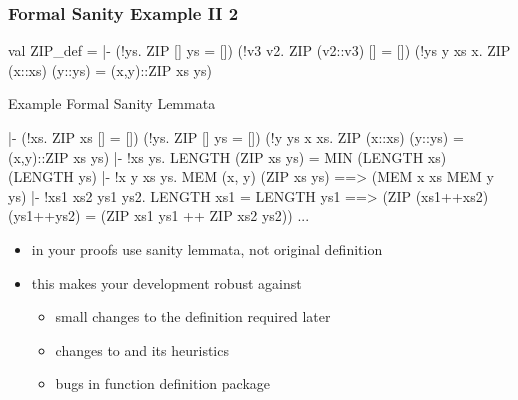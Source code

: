 \begin{frame}[fragile]
\frametitle{Formal Sanity Example II 2}

\begin{semiverbatim}\scriptsize
val ZIP_def =
 |- (!ys. ZIP [] ys = []) \holAnd{} (!v3 v2. ZIP (v2::v3) [] = []) \holAnd{}
    (!ys y xs x. ZIP (x::xs) (y::ys) = (x,y)::ZIP xs ys)
\end{semiverbatim}
\begin{block}{Example Formal Sanity Lemmata}
\begin{semiverbatim}\scriptsize
|- (!xs. ZIP xs [] = []) \holAnd{} (!ys. ZIP [] ys = []) \holAnd{}
   (!y ys x xs. ZIP (x::xs) (y::ys) = (x,y)::ZIP xs ys)\smallskip
|- !xs ys. LENGTH (ZIP xs ys) = MIN (LENGTH xs) (LENGTH ys)\smallskip
|- !x y xs ys. MEM (x, y) (ZIP xs ys) ==> (MEM x xs \holAnd{} MEM y ys)\smallskip
|- !xs1 xs2 ys1 ys2. LENGTH xs1 = LENGTH ys1 ==>
                     (ZIP (xs1++xs2) (ys1++ys2) = (ZIP xs1 ys1 ++ ZIP xs2 ys2))\smallskip
...
\end{semiverbatim}
\end{block}
\begin{itemize}
\item in your proofs use sanity lemmata, not original definition
\item this makes your development robust against
\begin{itemize}
\item small changes to the definition required later
\item changes to  and its heuristics
\item bugs in function definition package
\end{itemize}
\end{itemize}
\end{frame}





